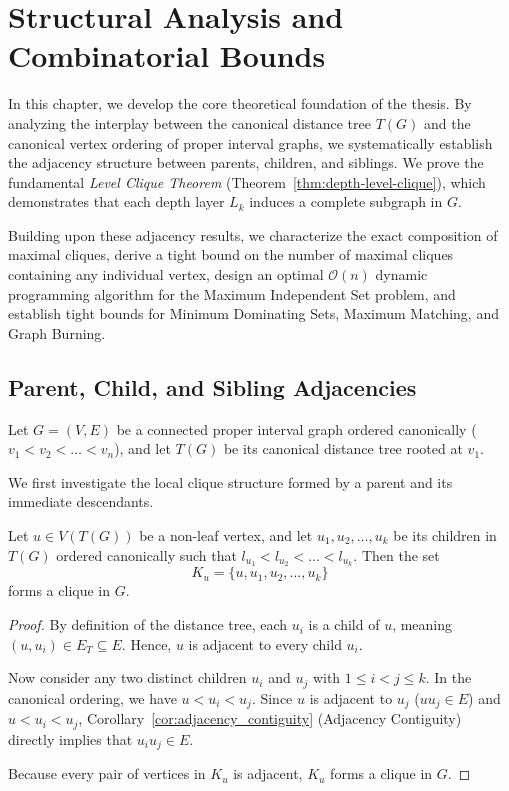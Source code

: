 \chapter{Structural Analysis and Combinatorial Bounds}
\label{chap:structure}

In this chapter, we develop the core theoretical foundation of the thesis. By analyzing the interplay between the canonical distance tree $T(G)$ and the canonical vertex ordering of proper interval graphs, we systematically establish the adjacency structure between parents, children, and siblings. We prove the fundamental \emph{Level Clique Theorem} (Theorem~\ref{thm:depth-level-clique}), which demonstrates that each depth layer $L_k$ induces a complete subgraph in $G$. 

Building upon these adjacency results, we characterize the exact composition of maximal cliques, derive a tight bound on the number of maximal cliques containing any individual vertex, design an optimal $\mathcal{O}(n)$ dynamic programming algorithm for the Maximum Independent Set problem, and establish tight bounds for Minimum Dominating Sets, Maximum Matching, and Graph Burning.

\section{Parent, Child, and Sibling Adjacencies}
\label{sec:struct_adjacencies}

Let $G = (V, E)$ be a connected proper interval graph ordered canonically ($v_1 < v_2 < \dots < v_n$), and let $T(G)$ be its canonical distance tree rooted at $v_1$. 

We first investigate the local clique structure formed by a parent and its immediate descendants.

\begin{lemma}
\label{lem:parent_children_clique}
Let $u \in V(T(G))$ be a non-leaf vertex, and let $u_1, u_2, \dots, u_k$ be its children in $T(G)$ ordered canonically such that $l_{u_1} < l_{u_2} < \dots < l_{u_k}$. Then the set
\begin{equation}
    K_u = \{u, u_1, u_2, \dots, u_k\}
\end{equation}
forms a clique in $G$.
\end{lemma}
\begin{proof}
By definition of the distance tree, each $u_i$ is a child of $u$, meaning $(u, u_i) \in E_T \subseteq E$. Hence, $u$ is adjacent to every child $u_i$. 

Now consider any two distinct children $u_i$ and $u_j$ with $1 \le i < j \le k$. In the canonical ordering, we have $u < u_i < u_j$. Since $u$ is adjacent to $u_j$ ($u u_j \in E$) and $u < u_i < u_j$, Corollary~\ref{cor:adjacency_contiguity} (Adjacency Contiguity) directly implies that $u_i u_j \in E$. 

Because every pair of vertices in $K_u$ is adjacent, $K_u$ forms a clique in $G$.
\end{proof}

